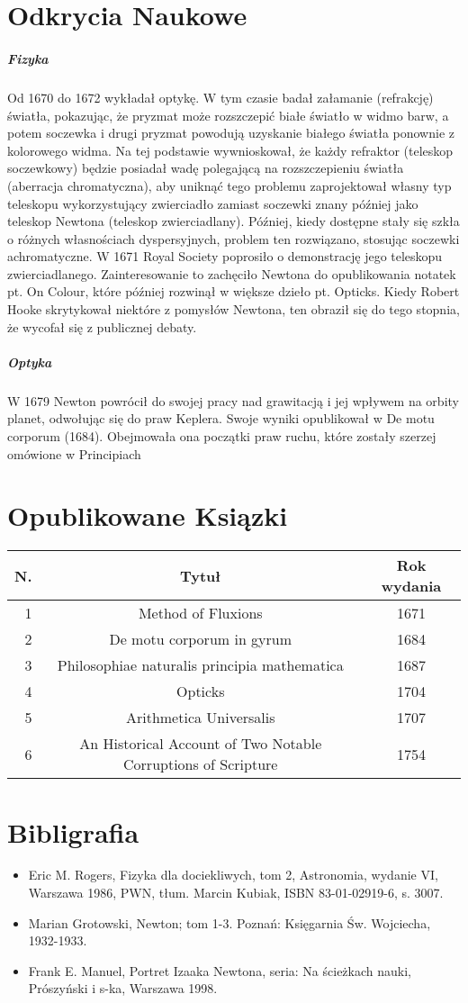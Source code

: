 \documentclass[a4paper, 11pt]{article}
\begin{document}
\section*{Odkrycia Naukowe}
\subparagraph{Fizyka\newline}
Od 1670 do 1672 wykładał optykę. W tym czasie badał załamanie (refrakcję) światła, pokazując, że pryzmat może rozszczepić białe światło w widmo barw, a potem soczewka i drugi pryzmat powodują uzyskanie białego światła ponownie z kolorowego widma. Na tej podstawie wywnioskował, że każdy refraktor (teleskop soczewkowy) będzie posiadał wadę polegającą na rozszczepieniu światła (aberracja chromatyczna), aby uniknąć tego problemu zaprojektował własny typ teleskopu wykorzystujący zwierciadło zamiast soczewki znany później jako teleskop Newtona (teleskop zwierciadlany). Później, kiedy dostępne stały się szkła o różnych własnościach dyspersyjnych, problem ten rozwiązano, stosując soczewki achromatyczne. W 1671 Royal Society poprosiło o demonstrację jego teleskopu zwierciadlanego. Zainteresowanie to zachęciło Newtona do opublikowania notatek pt. On Colour, które później rozwinął w większe dzieło pt. Opticks. Kiedy Robert Hooke skrytykował niektóre z pomysłów Newtona, ten obraził się do tego stopnia, że wycofał się z publicznej debaty.

\subparagraph{Optyka\newline}
W 1679 Newton powrócił do swojej pracy nad grawitacją i jej wpływem na orbity planet, odwołując się do praw Keplera. Swoje wyniki opublikował w De motu corporum (1684). Obejmowała ona początki praw ruchu, które zostały szerzej omówione w Principiach
\section*{Opublikowane Ksiązki}
\begin{tabular}{|r|c|c|}
\hline 
N. & Tytuł & Rok wydania \\
\hline
1   & Method of Fluxions & 1671 \\
\hline
2   & De motu corporum in gyrum & 1684 \\
\hline
3   & Philosophiae naturalis principia mathematica & 1687 \\
\hline
4   & Opticks & 1704 \\
\hline
5   & Arithmetica Universalis  & 1707  \\
\hline
6   & An Historical Account of Two Notable Corruptions of Scripture  & 1754  \\
\hline   
\end{tabular} 
\newpage
\section*{Bibligrafia}
\begin{itemize}
\item Eric M. Rogers, Fizyka dla dociekliwych, tom 2, Astronomia, wydanie VI, Warszawa 1986, PWN, tłum. Marcin Kubiak, ISBN 83-01-02919-6, s. 3007.
\item Marian Grotowski, Newton; tom 1-3. Poznań: Księgarnia Św. Wojciecha, 1932-1933.
\item Frank E. Manuel, Portret Izaaka Newtona, seria: Na ścieżkach nauki, Prószyński i s-ka, Warszawa 1998.
\end{itemize}
\end{document}
